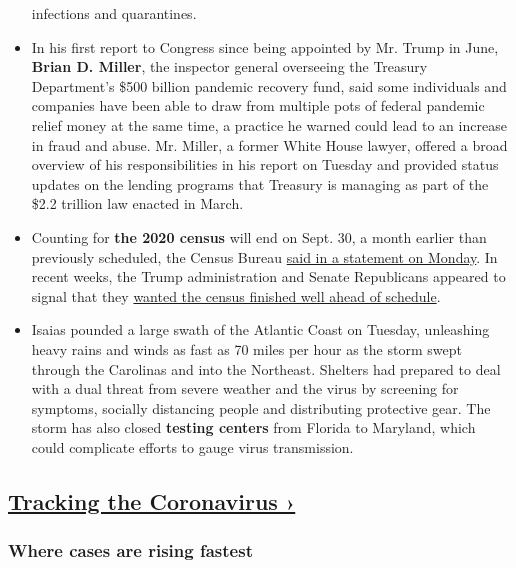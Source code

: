 \begin{itemize}
  infections and quarantines.
\item
  In his first report to Congress since being appointed by Mr. Trump in
  June, \textbf{Brian D. Miller}, the inspector general overseeing the
  Treasury Department's \$500 billion pandemic recovery fund, said some
  individuals and companies have been able to draw from multiple pots of
  federal pandemic relief money at the same time, a practice he warned
  could lead to an increase in fraud and abuse. Mr. Miller, a former
  White House lawyer, offered a broad overview of his responsibilities
  in his report on Tuesday and provided status updates on the lending
  programs that Treasury is managing as part of the \$2.2 trillion law
  enacted in March.
\item
  Counting for \textbf{the 2020 census} will end on Sept. 30, a month
  earlier than previously scheduled, the Census Bureau
  \href{https://www.census.gov/newsroom/press-releases/2020/delivering-complete-accurate-count.html}{said
  in a statement on Monday}. In recent weeks, the Trump administration
  and Senate Republicans appeared to signal that they
  \href{https://www.nytimes3xbfgragh.onion/2020/07/28/us/trump-census.html}{wanted
  the census finished well ahead of schedule}.
\item
  Isaias pounded a large swath of the Atlantic Coast on Tuesday,
  unleashing heavy rains and winds as fast as 70 miles per hour as the
  storm swept through the Carolinas and into the Northeast. Shelters had
  prepared to deal with a dual threat from severe weather and the virus
  by screening for symptoms, socially distancing people and distributing
  protective gear. The storm has also closed \textbf{testing centers}
  from Florida to Maryland, which could complicate efforts to gauge
  virus transmission.
\end{itemize}

\hypertarget{tracking-the-coronavirus-}{%
\subsection{\texorpdfstring{\href{https://www.nytimes3xbfgragh.onion/interactive/2020/us/coronavirus-us-cases.html}{Tracking
the Coronavirus
›}}{Tracking the Coronavirus ›}}\label{tracking-the-coronavirus-}}

\href{https://www.nytimes3xbfgragh.onion/interactive/2020/us/coronavirus-us-cases.html}{}

\hypertarget{where-cases-are-rising-fastest}{%
\subsubsection{\texorpdfstring{Where cases are \textbf{rising}
fastest}{Where cases are rising fastest}}\label{where-cases-are-rising-fastest}}

